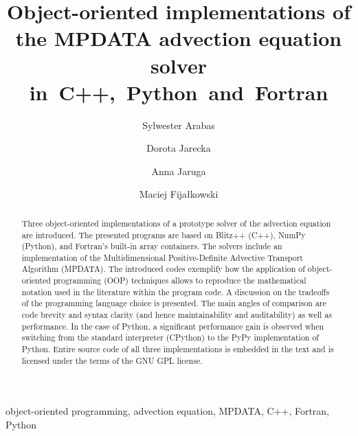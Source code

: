 \documentclass[review,peprint,10pt,5p,times]{elsarticle}
\begin{document}
  \begin{frontmatter}

    \title{
      Object-oriented implementations of the MPDATA advection equation solver in~C++,~Python~and~Fortran
    }

    \author[1]{Sylwester Arabas}
    \author[1]{Dorota Jarecka}
    \author[1]{Anna Jaruga}
    \author[2]{Maciej Fijałkowski}

    \address[1]{Institute of Geophysics, Faculty of Physics, University of Warsaw}
    \address[2]{PyPy Team}

    \begin{abstract}
        Three object-oriented implementations of a prototype solver of the advection equation are introduced.
        The presented programs are based on Blitz++ (C++), NumPy (Python), and Fortran's built-in array containers.
        The solvers include an implementation of the Multidimensional Positive-Definite 
          Advective Transport Algorithm (MPDATA).
        The introduced codes exemplify how the application of 
          object-oriented programming (OOP) techniques allows to reproduce the mathematical notation 
          used in the literature within the program code.
        A discussion on the tradeoffs of the programming language choice is presented.
        The main angles of comparison are code brevity and syntax clarity
          (and hence maintainability and auditability) as well as performance.
        In the case of Python, a significant performance gain is observed when switching from the standard 
          interpreter (CPython) to the PyPy implementation of Python.
        Entire source code of all three implementations is embedded in the text and is licensed
          under the terms of the GNU GPL license. 
    \end{abstract}

    \begin{keyword}
      object-oriented programming, advection equation, MPDATA, C++, Fortran, Python
    \end{keyword}

  \end{frontmatter}

\linenumbers %
\end{document}
